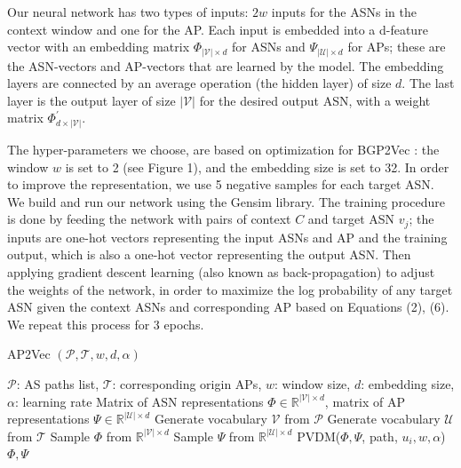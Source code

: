 \documentclass[10pt,journal]{IEEEtran}
\begin{document}
Our neural network has two types of inputs: $2w$ inputs for the ASNs in the context window and one for the AP. Each input is embedded into a d-feature vector with an embedding matrix $\Phi_{|\mathcal{V}|\times d}$ for ASNs and $\Psi_{|\mathcal{U}|\times d}$ for APs; these are the ASN-vectors and AP-vectors that are learned by the model. The embedding layers are connected by an average operation (the hidden layer) of size $d$. The last layer is the output layer of size $|\mathcal{V}|$ for the desired output ASN, with a weight matrix $\Phi^{\prime}_{d\times|\mathcal{V}|}$.

The hyper-parameters we choose, are based on optimization for BGP2Vec \cite{shapira2020deep}: the window $w$ is set to 2 (see Figure 1), and the embedding size is set to 32. In order to improve the representation, we use 5 negative samples \cite{mikolov2013distributed} for each target ASN. We build and run our network using the Gensim \cite{rehurek2010software} library. The training procedure is done by feeding the network with pairs of context $C$ and target ASN $v_{j}$; the inputs are one-hot vectors representing the input ASNs and AP and the training output, which is also a one-hot vector representing the output ASN. Then applying gradient descent learning \cite{lecun1998gradient} (also known as back-propagation) to adjust the weights of the network, in order to maximize the log probability of any target ASN given the context ASNs and corresponding AP based on Equations (2), (6). We repeat this process for 3 epochs.


\begin{algorithm}[htbp]
\caption{AP2Vec $(\mathcal{P},\mathcal{T}, w, d,\alpha)$}
\label{alg:ap2vec}
\begin{algorithmic}[1]
\Require $\mathcal{P}$: AS paths list, $\mathcal{T}$: corresponding origin APs, $w$: window size, $d$: embedding size, $\alpha$: learning rate
\Ensure Matrix of ASN representations $\Phi\in \mathbb{R}^{|\mathcal{V}|\times d}$, matrix of AP representations $\Psi\in \mathbb{R}^{|\mathcal{U}|\times d}$
\State Generate vocabulary $\mathcal{V}$ from $\mathcal{P}$
\State Generate vocabulary $\mathcal{U}$ from $\mathcal{T}$
\State Sample $\Phi$ from $\mathbb{R}^{|\mathcal{V}|\times d}$
\State Sample $\Psi$ from $\mathbb{R}^{|\mathcal{U}|\times d}$
\State PVDM($\Phi,\Psi$, path, $u_i, w,\alpha$)
\EndFor
\State \Return $\Phi,\Psi$
\end{algorithmic}
\end{algorithm}
\end{document}
